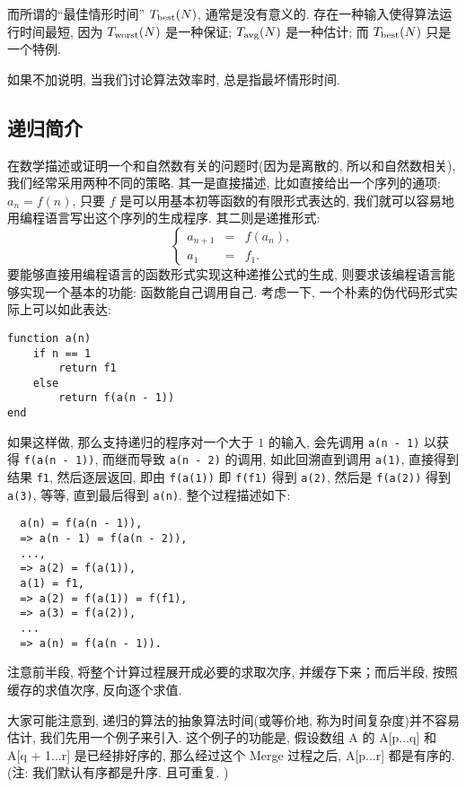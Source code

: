 \documentclass[a4paper]{ctexart}
\theoremstyle{definition}
\theoremstyle{definition}
\begin{document}
而所谓的``最佳情形时间'' $T_{\rm best}(N)$, 通常是没有意义的. 存在一种输入使得算法运行时间最短,
因为 $T_{\rm worst} (N)$ 是一种保证; $T_{\rm avg} (N)$ 是一种估计; 而
$T_{\rm best}(N)$ 只是一个特例.

如果不加说明, 当我们讨论算法效率时, 总是指最坏情形时间.

\subsection{递归简介}

在数学描述或证明一个和自然数有关的问题时(因为是离散的, 所以和自然数相关),
我们经常采用两种不同的策略. 其一是直接描述,
比如直接给出一个序列的通项: $a_n = f(n)$, 只要 $f$
是可以用基本初等函数的有限形式表达的, 我们就可以容易地用编程语言写出这个序列的生成程序.
其二则是递推形式:
\begin{equation}
  \left\{
  \begin{array}{rcl}
    a_{n + 1} &=& f(a_n), \\
    a_1 &=& f_1. 
  \end{array}\right.
  \label{eq::recursion_formula}
\end{equation}
要能够直接用编程语言的函数形式实现这种递推公式的生成,
则要求该编程语言能够实现一个基本的功能: 函数能自己调用自己.
考虑一下, 一个朴素的伪代码形式实际上可以如此表达:
\begin{verbatim}
function a(n)
    if n == 1
        return f1
    else
        return f(a(n - 1))
end
\end{verbatim}
如果这样做, 那么支持递归的程序对一个大于 $1$ 的输入, 会先调用
\verb|a(n - 1)| 以获得 \verb|f(a(n - 1))|, 而继而导致 \verb|a(n - 2)|
的调用, 如此回溯直到调用 \verb|a(1)|, 直接得到结果 \verb|f1|, 然后逐层返回, 即由
\verb|f(a(1))| 即 \verb|f(f1)| 得到 \verb|a(2)|, 然后是 \verb|f(a(2))| 得到
\verb|a(3)|, 等等, 直到最后得到 \verb|a(n)|. 整个过程描述如下:
\begin{verbatim}
  a(n) = f(a(n - 1)),
  => a(n - 1) = f(a(n - 2)),
  ...,
  => a(2) = f(a(1)),
  a(1) = f1,
  => a(2) = f(a(1)) = f(f1),
  => a(3) = f(a(2)),
  ...
  => a(n) = f(a(n - 1)).
\end{verbatim}

注意前半段, 将整个计算过程展开成必要的求取次序, 并缓存下来；而后半段, 按照缓存的求值次序, 
反向逐个求值.

大家可能注意到, 递归的算法的抽象算法时间(或等价地, 称为时间复杂度)并不容易估计, 我们先用一个例子来引入. 
这个例子的功能是, 假设数组 A 的 A[p...q] 和 A[q + 1...r] 是已经排好序的, 
那么经过这个 Merge 过程之后, A[p...r] 都是有序的. (注: 我们默认有序都是升序. 且可重复. )
\end{document}
